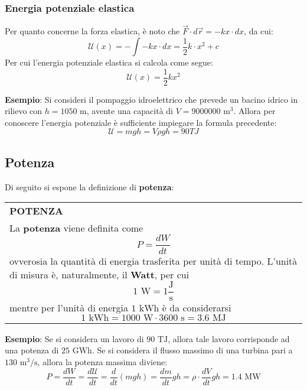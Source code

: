\documentclass[a4paper]{extarticle}
\renewcommand\arraystretch{}
\begin{document}
\vspace{1em}
\subsubsection{Energia potenziale elastica}
Per quanto concerne la forza elastica, è noto che $\vec F \cdot d \vec r = -k x \cdot dx$, da cui:
\[\mathcal{U}(x) = -\int - k x \cdot dx = \frac{1}{2}k \cdot x^2 + c\]
Per cui l'energia potenziale elastica si calcola come segue:
\[\boxed{\mathcal{U}(x)=\frac{1}{2}k x^2}\]

\vspace{1em}
\noindent
\textbf{Esempio}: Si consideri il pompaggio idroelettrico che prevede un bacino idrico in rilievo con $h=1050 \text{ m}$, avente una capacità di $V=9000000 \text{ m}^3$. Allora per conoscere l'energia potenziale è sufficiente impiegare la formula precedente:
\[\mathcal{U}=mgh=V \rho g h = 90 TJ\]

\vspace{1em}
\subsection{Potenza}
Di seguito si espone la definizione di \textbf{potenza}:

\vspace{1em}
\setlength{\tabcolsep}{14pt}
\renewcommand{\arraystretch}{2}
\noindent
\begin{tabularx}{\textwidth}{@{}|P|@{}}
    \hline
    {\textbf{POTENZA}}\\
    \parbox{\linewidth}{La \textbf{potenza} viene definita come
    \[\boxed{P=\frac{dW}{dt}}\]
    ovverosia la quantità di energia trasferita per unità di tempo. L'unità di misura è, naturalmente, il \textbf{Watt}, per cui
    \[\boxed{1 \text{ W} = 1 \frac{\text{J}}{\text{s}}}\]
    mentre per l'unità di energia $1 \text{ kWh}$ è da considerarsi
    \[\boxed{1 \text{ kWh} = 1000 \text{ W} \cdot 3600 \text{ s} = 3.6 \text{ MJ}}\]
    \vspace{-3mm}}\\
    \hline
\end{tabularx}

\vspace{1em}
\noindent
\textbf{Esempio}: Se si considera un lavoro di $90 \text{ TJ}$, allora tale lavoro corrisponde ad una potenza di $25 \text{ GWh}$. Se si considera il flusso massimo di una turbina pari a $130 \text{ m}^3/\text{s}$, allora la potenza massima diviene:
\[P=\frac{dW}{dt}=\frac{d\mathcal{U}}{dt}=\frac{d}{dt}(mgh)=\frac{dm}{dt} gh = \rho \cdot \frac{dV}{dt} gh = 1.4 \text{ MW}\]
\end{document}

